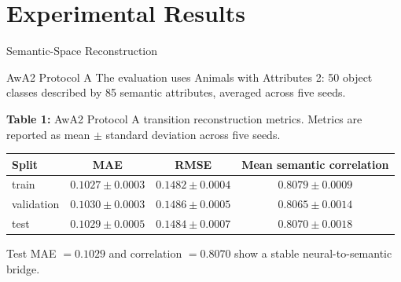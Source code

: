 \documentclass[aspectratio=169,xcolor=dvipsnames]{beamer}
\begin{document}
\section{Experimental Results}

\begin{frame}{Semantic-Space Reconstruction}
\small
\begin{block}{AwA2 Protocol A}
\small
The evaluation uses Animals with Attributes 2: 50 object classes described by 85 semantic attributes, averaged across five seeds.
\end{block}
\vspace{0.25em}
{\scriptsize \textbf{Table 1:} AwA2 Protocol A transition reconstruction metrics. Metrics are reported as mean \(\pm\) standard deviation across five seeds.\par}
\vspace{0.15em}
\scriptsize
\begin{tabularx}{\linewidth}{lccc}
\toprule
\textbf{Split} & \textbf{MAE} & \textbf{RMSE} & \textbf{Mean semantic correlation}\\
\midrule
train & \(0.1027\pm0.0003\) & \(0.1482\pm0.0004\) & \(0.8079\pm0.0009\)\\
validation & \(0.1030\pm0.0003\) & \(0.1486\pm0.0005\) & \(0.8065\pm0.0014\)\\
test & \(0.1029\pm0.0005\) & \(0.1484\pm0.0007\) & \(0.8070\pm0.0018\)\\
\bottomrule
\end{tabularx}
\vspace{0.25em}
{\scriptsize Test MAE \(=0.1029\) and correlation \(=0.8070\) show a stable neural-to-semantic bridge.\par}
\end{frame}
\end{document}
